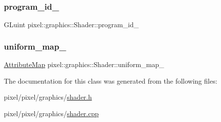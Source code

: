 \subsubsection{\texorpdfstring{program\+\_\+id\+\_\+}{program\_id\_}}
{\footnotesize\ttfamily G\+Luint pixel\+::graphics\+::\+Shader\+::program\+\_\+id\+\_\+}

\mbox{\label{classpixel_1_1graphics_1_1_shader_aa4146f49500b0010264b791caf576d41}} 
\subsubsection{\texorpdfstring{uniform\+\_\+map\+\_\+}{uniform\_map\_}}
{\footnotesize\ttfamily \hyperlink{namespacepixel_1_1graphics_ab235534714f227408c552e912c5985de}{Attribute\+Map} pixel\+::graphics\+::\+Shader\+::uniform\+\_\+map\+\_\+}



The documentation for this class was generated from the following files\+:\begin{DoxyCompactItemize}
\item 
pixel/pixel/graphics/\hyperlink{shader_8h}{shader.\+h}\item 
pixel/pixel/graphics/\hyperlink{shader_8cpp}{shader.\+cpp}\end{DoxyCompactItemize}
